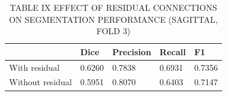 \begin{table}[htbp]
\centering
\caption{TABLE IX EFFECT OF RESIDUAL CONNECTIONS ON SEGMENTATION PERFORMANCE (SAGITTAL, FOLD 3)}
\label{tab:table\_009}
\begin{tabular}{lllll}
\hline
 & Dice & Precision & Recall & F1 \\
\hline
With residual & 0.6260 & 0.7838 & 0.6931 & 0.7356 \\
Without residual & 0.5951 & 0.8070 & 0.6403 & 0.7147 \\
\hline
\end{tabular}
\end{table}
